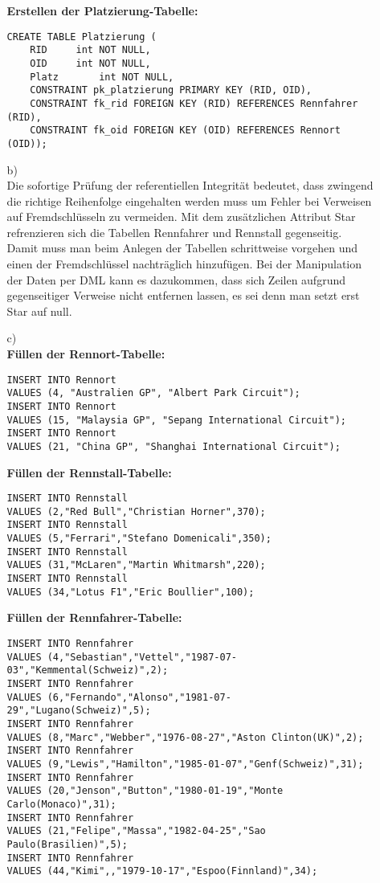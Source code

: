 \documentclass[a4paper,11pt,fleqn]{scrartcl}
\begin{document}
\begin{enumerate}
\begin{enumerate}
			\textbf{Erstellen der Platzierung-Tabelle:}
			\begin{lstlisting}
CREATE TABLE Platzierung (
	RID		int NOT NULL,
	OID		int NOT NULL,
	Platz		int NOT NULL,
	CONSTRAINT pk_platzierung PRIMARY KEY (RID, OID),
	CONSTRAINT fk_rid FOREIGN KEY (RID) REFERENCES Rennfahrer (RID),
	CONSTRAINT fk_oid FOREIGN KEY (OID) REFERENCES Rennort (OID));
			\end{lstlisting}
			\item[b)]\quad \\
				Die sofortige Prüfung der referentiellen Integrität bedeutet, dass zwingend die richtige
				Reihenfolge eingehalten werden muss um Fehler bei Verweisen auf Fremdschlüsseln zu vermeiden. Mit
				dem zusätzlichen Attribut Star refrenzieren sich die Tabellen Rennfahrer und Rennstall
				gegenseitig. Damit muss man beim Anlegen der Tabellen schrittweise vorgehen und einen der
				Fremdschlüssel nachträglich hinzufügen. Bei der Manipulation der Daten per DML kann es dazukommen,
				dass sich Zeilen aufgrund gegenseitiger Verweise nicht entfernen lassen, es sei denn man setzt 
				erst Star auf null.
			
			
			\item[c)]\quad \\
			\textbf{Füllen der Rennort-Tabelle:}
\begin{lstlisting}
INSERT INTO Rennort
VALUES (4, "Australien GP", "Albert Park Circuit");
INSERT INTO Rennort
VALUES (15, "Malaysia GP", "Sepang International Circuit");
INSERT INTO Rennort
VALUES (21, "China GP", "Shanghai International Circuit");
\end{lstlisting}

\textbf{Füllen der Rennstall-Tabelle:}
\begin{lstlisting}
INSERT INTO Rennstall
VALUES (2,"Red Bull","Christian Horner",370);
INSERT INTO Rennstall
VALUES (5,"Ferrari","Stefano Domenicali",350);
INSERT INTO Rennstall
VALUES (31,"McLaren","Martin Whitmarsh",220);
INSERT INTO Rennstall
VALUES (34,"Lotus F1","Eric Boullier",100);
\end{lstlisting}

\textbf{Füllen der Rennfahrer-Tabelle:}
\begin{lstlisting}
INSERT INTO Rennfahrer
VALUES (4,"Sebastian","Vettel","1987-07-03","Kemmental(Schweiz)",2);
INSERT INTO Rennfahrer
VALUES (6,"Fernando","Alonso","1981-07-29","Lugano(Schweiz)",5);
INSERT INTO Rennfahrer
VALUES (8,"Marc","Webber","1976-08-27","Aston Clinton(UK)",2);
INSERT INTO Rennfahrer
VALUES (9,"Lewis","Hamilton","1985-01-07","Genf(Schweiz)",31);
INSERT INTO Rennfahrer
VALUES (20,"Jenson","Button","1980-01-19","Monte Carlo(Monaco)",31);
INSERT INTO Rennfahrer
VALUES (21,"Felipe","Massa","1982-04-25","Sao Paulo(Brasilien)",5);
INSERT INTO Rennfahrer
VALUES (44,"Kimi",,"1979-10-17","Espoo(Finnland)",34);
\end{lstlisting}


\end{enumerate}
\end{enumerate}
\end{document}
